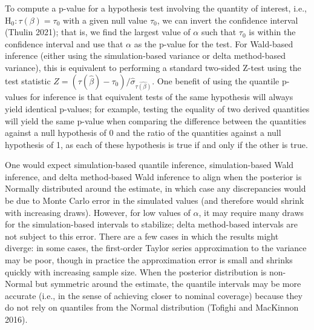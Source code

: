 To compute a p-value for a hypothesis test involving the quantity of interest, i.e., \(\text{H}_0: \tau (\beta) = \tau_0\) with a given null value \(\tau_0\), we can invert the confidence interval (Thulin 2021); that is, we find the largest value of \(\alpha\) such that \(\tau_0\) is within the confidence interval and use that \(\alpha\) as the p-value for the test. For Wald-based inference (either using the simulation-based variance or delta method-based variance), this is equivalent to performing a standard two-sided Z-test using the test statistic \(Z=\left(\tau(\hat\beta)-\tau_0\right) / \hat\sigma_{\widehat{\tau(\beta)}}\). One benefit of using the quantile p-values for inference is that equivalent tests of the same hypothesis will always yield identical p-values; for example, testing the equality of two derived quantities will yield the same p-value when comparing the difference between the quantities against a null hypothesis of 0 and the ratio of the quantities against a null hypothesis of 1, as each of these hypothesis is true if and only if the other is true.

One would expect simulation-based quantile inference, simulation-based Wald inference, and delta method-based Wald inference to align when the posterior is Normally distributed around the estimate, in which case any discrepancies would be due to Monte Carlo error in the simulated values (and therefore would shrink with increasing draws). However, for low values of \(\alpha\), it may require many draws for the simulation-based intervals to stabilize; delta method-based intervals are not subject to this error. There are a few cases in which the results might diverge: in some cases, the first-order Taylor series approximation to the variance may be poor, though in practice the approximation error is small and shrinks quickly with increasing sample size. When the posterior distribution is non-Normal but symmetric around the estimate, the quantile intervals may be more accurate (i.e., in the sense of achieving closer to nominal coverage) because they do not rely on quantiles from the Normal distribution (Tofighi and MacKinnon 2016).

